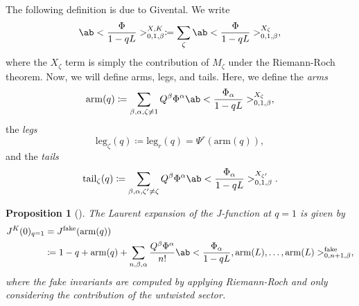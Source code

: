 \documentclass{amsart}
\newtheorem{prop}[thm]{Proposition}
\theoremstyle{definition}
\theoremstyle{remark}
\theoremstyle{plain}
\theoremstyle{definition}
\theoremstyle{remark}
\newcommand{\mr}[1]{\mathrm{#1}}
\newcommand{\1}{\mathbf{1}}
\newcommand{\2}{\mathbf{2}}
\newcommand{\3}{\mathbf{3}}
\begin{document}
%
%

The following definition is due to Givental. We write
\[ \ab<\frac{\Phi}{1-qL}>_{0,1,\beta}^{X,K} \coloneqq \sum_{\zeta} \ab<\frac{\Phi}{1-qL}>_{0,1,\beta}^{X_{\zeta}}, \]
where the \(X_{\zeta}\) term is simply the contribution of \(M_{\zeta}\) under the Riemann-Roch theorem. Now, we will define arms, legs, and tails. Here, we define the \textit{arms}
\[ \mr{arm}(q) \coloneqq \sum_{\beta, \alpha, \zeta \neq 1} Q^{\beta} \Phi^{\alpha}\ab<\frac{\Phi_{\alpha}}{1-qL}>_{0,1,\beta}^{X_{\zeta}}, \]
the \textit{legs}
\[ \mr{leg}_{\zeta}(q) \coloneqq \mr{leg}_r(q) = \Psi^r (\mr{arm}(q)), \]
and the \textit{tails}
\[ \mr{tail}_{\zeta}(q) \coloneqq \sum_{\beta, \alpha, \zeta' \neq \zeta} Q^{\beta} \Phi^{\alpha} \ab<\frac{\Phi_{\alpha}}{1-qL}>_{0,1,\beta}^{X_{\zeta'}}. \]

\begin{prop}[{\cite{GiventalTonita2014}}]
    The Laurent expansion of the J-function at \(q = 1\) is given by
    \begin{align*}
        J^K(0)_{q=1} &= J^{\mr{fake}}(\mr{arm}(q)) \\
        &\coloneqq 1-q + \mr{arm}(q) + \sum_{n,\beta,\alpha} \frac{Q^{\beta}\Phi^{\alpha}}{n!} \ab<\frac{\Phi_{\alpha}}{1-qL}, \mr{arm}(L), \ldots, \mr{arm}(L)>_{0,n+1,\beta}^{\mr{fake}},
    \end{align*}
    where the fake invariants are computed by applying Riemann-Roch and only considering the contribution of the untwisted sector.
\end{prop}
\end{document}
